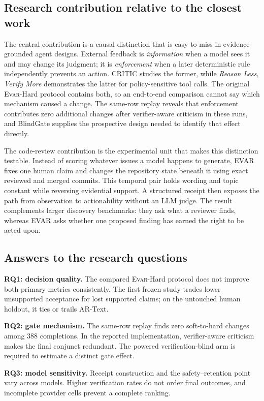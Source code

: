\documentclass[acmsmall,screen,review,anonymous]{acmart}
\newcommand{\evar}{\textsc{Evar}\xspace}
\begin{document}
\subsection{Research contribution relative to the closest work}

The central contribution is a causal distinction that is easy to miss in evidence-grounded agent designs. External feedback is \emph{information} when a model sees it and may change its judgment; it is \emph{enforcement} when a later deterministic rule independently prevents an action. CRITIC studies the former, while \emph{Reason Less, Verify More} demonstrates the latter for policy-sensitive tool calls. The original \evar-Hard protocol contains both, so an end-to-end comparison cannot say which mechanism caused a change. The same-row replay reveals that enforcement contributes zero additional changes after verifier-aware criticism in these runs, and BlindGate supplies the prospective design needed to identify that effect directly.

The code-review contribution is the experimental unit that makes this distinction testable. Instead of scoring whatever issues a model happens to generate, EVAR fixes one human claim and changes the repository state beneath it using exact reviewed and merged commits. This temporal pair holds wording and topic constant while reversing evidential support. A structured receipt then exposes the path from observation to actionability without an LLM judge. The result complements larger discovery benchmarks: they ask what a reviewer finds, whereas EVAR asks whether one proposed finding has earned the right to be acted upon.

\subsection{Answers to the research questions}

\textbf{RQ1: decision quality.} The compared \evar-Hard protocol does not improve both primary metrics consistently. The first frozen study trades lower unsupported acceptance for lost supported claims; on the untouched human holdout, it ties or trails AR-Text.

\textbf{RQ2: gate mechanism.} The same-row replay finds zero soft-to-hard changes among 388 completions. In the reported implementation, verifier-aware criticism makes the final conjunct redundant. The powered verification-blind arm is required to estimate a distinct gate effect.

\textbf{RQ3: model sensitivity.} Receipt construction and the safety--retention point vary across models. Higher verification rates do not order final outcomes, and incomplete provider cells prevent a complete ranking.
\end{document}
